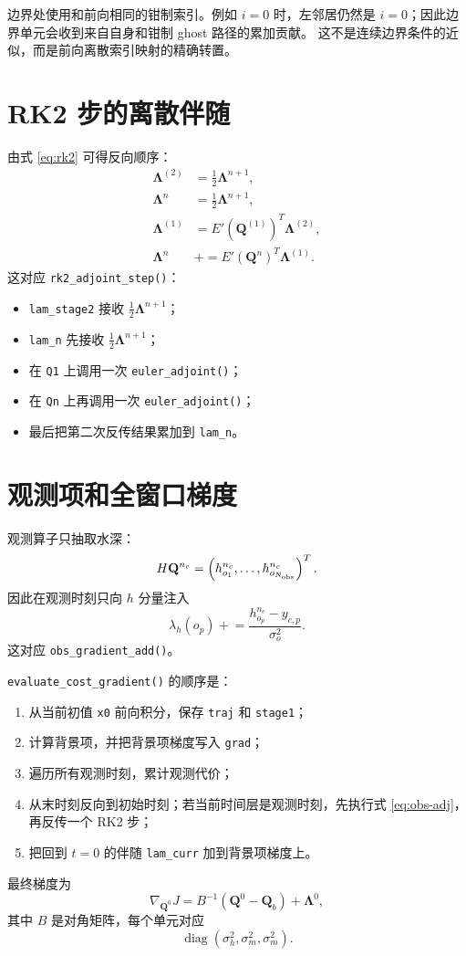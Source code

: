 \documentclass[12pt,a4paper]{article}
\begin{document}
边界处使用和前向相同的钳制索引。例如 $i=0$ 时，左邻居仍然是
$i=0$；因此边界单元会收到来自自身和钳制 ghost 路径的累加贡献。
这不是连续边界条件的近似，而是前向离散索引映射的精确转置。

\section{RK2 步的离散伴随}

由式 \eqref{eq:rk2} 可得反向顺序：
\begin{align}
\bm{\Lambda}^{(2)} &= \frac12\bm{\Lambda}^{n+1},\\
\bm{\Lambda}^{n}   &= \frac12\bm{\Lambda}^{n+1},\\
\bm{\Lambda}^{(1)} &= E'(\mathbf{Q}^{(1)})^T\bm{\Lambda}^{(2)},\\
\bm{\Lambda}^{n}   &\mathrel{+}= E'(\mathbf{Q}^{n})^T\bm{\Lambda}^{(1)}.
\label{eq:rk2-adj}
\end{align}
这对应 \texttt{rk2\_adjoint\_step()}：
\begin{itemize}
\item \texttt{lam\_stage2} 接收 $\frac12\bm{\Lambda}^{n+1}$；
\item \texttt{lam\_n} 先接收 $\frac12\bm{\Lambda}^{n+1}$；
\item 在 \texttt{Q1} 上调用一次 \texttt{euler\_adjoint()}；
\item 在 \texttt{Qn} 上再调用一次 \texttt{euler\_adjoint()}；
\item 最后把第二次反传结果累加到 \texttt{lam\_n}。
\end{itemize}

\section{观测项和全窗口梯度}

观测算子只抽取水深：
\[
H\mathbf{Q}^{n_c}
=
\left(
h_{o_1}^{n_c},\ldots,h_{o_{N_{\rm obs}}}^{n_c}
\right)^T.
\]
因此在观测时刻只向 $h$ 分量注入
\begin{equation}
\lambda_h(o_p)\mathrel{+}=
\frac{h_{o_p}^{n_c}-y_{c,p}}{\sigma_o^2}.
\label{eq:obs-adj}
\end{equation}
这对应 \texttt{obs\_gradient\_add()}。

\texttt{evaluate\_cost\_gradient()} 的顺序是：
\begin{enumerate}
\item 从当前初值 \texttt{x0} 前向积分，保存 \texttt{traj} 和 \texttt{stage1}；
\item 计算背景项，并把背景项梯度写入 \texttt{grad}；
\item 遍历所有观测时刻，累计观测代价；
\item 从末时刻反向到初始时刻；若当前时间层是观测时刻，先执行式
      \eqref{eq:obs-adj}，再反传一个 RK2 步；
\item 把回到 $t=0$ 的伴随 \texttt{lam\_curr} 加到背景项梯度上。
\end{enumerate}
最终梯度为
\begin{equation}
\nabla_{\mathbf{Q}^0}J
=
B^{-1}(\mathbf{Q}^0-\mathbf{Q}_b)+\bm{\Lambda}^{0},
\label{eq:grad}
\end{equation}
其中 $B$ 是对角矩阵，每个单元对应
\[
\operatorname{diag}(\sigma_h^2,\sigma_m^2,\sigma_m^2).
\]
\end{document}
